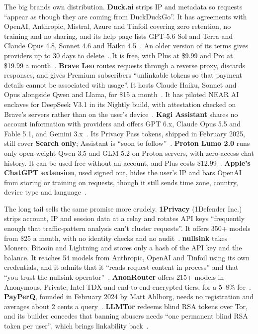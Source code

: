 \documentclass[10pt,a4paper]{article}
\begin{document}
The big brands own distribution. \textbf{Duck.ai} strips IP and metadata so requests ``appear as though they are coming from DuckDuckGo''. It has agreements with OpenAI, Anthropic, Mistral, Azure and Tinfoil covering zero retention, no training and no sharing, and its help page lists GPT-5.6 Sol and Terra and Claude Opus 4.8, Sonnet 4.6 and Haiku 4.5~\cite{duckduckgo-help-duck-ai}. An older version of its terms gives providers up to 30 days to delete~\cite{duck-ai-privacy-terms}. It is free, with Plus at \$9.99 and Pro at \$19.99 a month~\cite{spread-privacy-duckduckgo}. \textbf{Brave Leo} routes requests through a reverse proxy, discards responses, and gives Premium subscribers ``unlinkable tokens so that payment details cannot be associated with usage''. It hosts Claude Haiku, Sonnet and Opus alongside Qwen and Llama, for \$15 a month~\cite{wikipedia-brave-leo}. It has piloted NEAR AI enclaves for DeepSeek V3.1 in its Nightly build, with attestation checked on Brave's servers rather than on the user's device~\cite{brave-blog-browser-ai}. \textbf{Kagi Assistant} shares no account information with providers and offers GPT 6.x, Claude Opus 5.5 and Fable 5.1, and Gemini 3.x~\cite{kagi-docs-assistant}. Its Privacy Pass tokens, shipped in February 2025, still cover \textbf{Search only}; Assistant is ``soon to follow''~\cite{kagi-docs-privacy-pass}. \textbf{Proton Lumo 2.0} runs only open-weight Qwen 3.5 and GLM 5.2 on Proton servers, with zero-access chat history. It can be used free without an account, and Plus costs \$12.99~\cite{macrumors-proton-lumo-2}. \textbf{Apple's ChatGPT extension}, used signed out, hides the user's IP and bars OpenAI from storing or training on requests, though it still sends time zone, country, device type and language~\cite{apple-chatgpt-extension-pr}.

The long tail sells the same promise more crudely. \textbf{1Privacy} (1Defender Inc.) strips account, IP and session data at a relay and rotates API keys ``frequently enough that traffic-pattern analysis can't cluster requests''. It offers 350+ models from \$25 a month, with no identity checks and no audit~\cite{1privacy-ai}. \textbf{nullsink} takes Monero, Bitcoin and Lightning and stores only a hash of the API key and the balance. It reaches 54 models from Anthropic, OpenAI and Tinfoil using its own credentials, and it admits that it ``reads request content in process'' and that ``you trust the nullsink operator''~\cite{nullsink-trust}. \textbf{AnonRouter} offers 215+ models in Anonymous, Private, Intel TDX and end-to-end-encrypted tiers, for a 5--8\% fee~\cite{anonrouter-ai}. \textbf{PayPerQ}, founded in February 2024 by Matt Ahlborg, needs no registration and averages about 2 cents a query~\cite{ppq-ai-payperq}. \textbf{LLMTor} redeems blind RSA tokens over Tor, and its builder concedes that banning abusers needs ``one permanent blind RSA token per user'', which brings linkability back~\cite{hacker-news-llmtor}.
\end{document}
